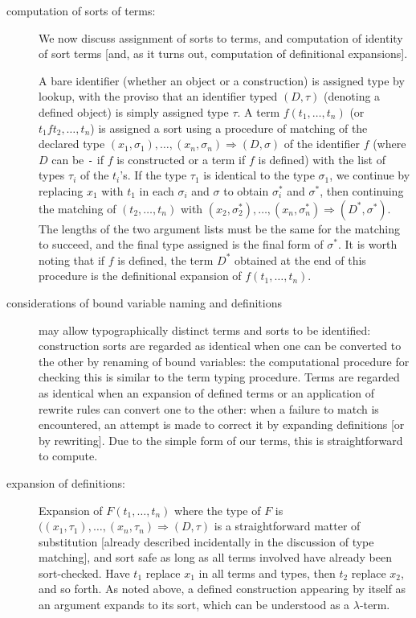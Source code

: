 \documentclass[12pt]{article}
\begin{document}
\begin{description}
\item[computation of sorts of terms:]  We now discuss assignment of sorts to terms, and computation of identity of sort terms [and, as it turns out, computation of definitional expansions].

A bare identifier (whether an object or a construction) is assigned type by lookup, with the proviso that an identifier typed $(D,\tau)$ (denoting a defined object) is
simply assigned type $\tau$.   A term $f(t_1,\ldots,t_n)$ (or $t_1 f t_2,\ldots,t_n$) is assigned a sort using a procedure of matching of the declared type
$(x_1,\sigma_1),\ldots,(x_n,\sigma_n) \Rightarrow (D,\sigma)$ of the identifier $f$ (where $D$ can be {\tt -} if $f$ is constructed or a term if $f$ is defined) with the list of types $\tau_i$ of the $t_i$'s.
If the type $\tau_1$ is identical to the type $\sigma_1$, we continue by replacing $x_1$ with $t_1$ in each $\sigma_i$ and $\sigma$ to obtain $\sigma_i^*$ and $\sigma^*$,
then continuing the matching of $(t_2,\ldots,t_n)$ with $(x_2,\sigma^*_2),\ldots,(x_n,\sigma^*_n)\Rightarrow (D^*,\sigma^*)$.  The lengths of the two argument lists must be the same
for the matching to succeed, and the final type assigned is the final form of $\sigma^*$.  It is worth noting that if $f$ is defined, the term $D^*$ obtained at the end of this procedure is the definitional expansion of $f(t_1,\ldots,t_n)$.

\item[considerations of bound variable naming and definitions]  may allow typographically distinct terms and sorts to be identified:  construction sorts are regarded as identical when one can be converted to the other by renaming of bound variables:  the computational procedure for checking this is similar to the term typing procedure.   Terms are regarded as identical when an expansion of defined terms or an application of rewrite rules can convert one to the other:  when a failure to match is encountered, an attempt is made to correct it by expanding definitions [or by rewriting].   Due to the simple form of our terms, this is straightforward to compute.

\item[expansion of definitions:]  Expansion of $F(t_1,\ldots,t_n)$ where the type of $F$ is $((x_1,\tau_1),\ldots,(x_n,\tau_n) \Rightarrow (D,\tau)$ is a straightforward matter of substitution [already described incidentally in the discussion of type matching], and sort safe as long as all terms involved have already been sort-checked.  Have $t_1$ replace $x_1$ in all terms and types, then $t_2$ replace $x_2$, and so forth.
As noted above, a defined construction appearing by itself as an argument expands to its sort, which can be understood as a $\lambda$-term.


\end{description}
\end{document}

